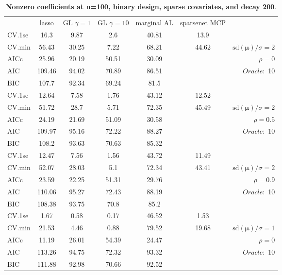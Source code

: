 \begin{table}\vspace{-.5cm}
\caption[l]{ { \bf Nonzero coefficients at n=100, binary design, 
sparse covariates, and  decay  200}.}
\vspace{-.5cm}
\footnotesize{}
\begin{center}
\begin{tabular}{l*{5}{c}|r}
& lasso & GL $\gamma=1$ & GL $\gamma=10$ & marginal AL & sparsenet MCP  & \\
 \cline{1-7}
CV.1se & 16.3 & 9.87 & 2.6 & 40.81 & 13.9 & \\
CV.min & 56.43 & 30.25 & 7.22 & 68.21 & 44.62 &  $\mathrm{sd}(\mathbf{\mu})/\sigma=2$ \\
AICc & 25.96 & 20.19 & 50.51 & 30.09 & & $\rho=0$ \\
AIC & 109.46 & 94.02 & 70.89 & 86.51 & &  \multirow{2}{*}{$Oracle: $ 10} \\
BIC & 107.7 & 92.34 & 69.24 & 81.5 & &  \\
 \hline 
CV.1se & 12.64 & 7.58 & 1.76 & 43.12 & 12.52 & \\
CV.min & 51.72 & 28.7 & 5.71 & 72.35 & 45.49 &  $\mathrm{sd}(\mathbf{\mu})/\sigma=2$ \\
AICc & 24.19 & 21.69 & 51.09 & 30.58 & & $\rho=0.5$ \\
AIC & 109.97 & 95.16 & 72.22 & 88.27 & &  \multirow{2}{*}{$Oracle: $ 10} \\
BIC & 108.2 & 93.63 & 70.63 & 85.32 & &  \\
 \hline 
CV.1se & 12.47 & 7.56 & 1.56 & 43.72 & 11.49 & \\
CV.min & 52.07 & 28.03 & 5.1 & 72.34 & 43.41 &  $\mathrm{sd}(\mathbf{\mu})/\sigma=2$ \\
AICc & 23.59 & 22.25 & 51.31 & 29.76 & & $\rho=0.9$ \\
AIC & 110.06 & 95.27 & 72.43 & 88.19 & &  \multirow{2}{*}{$Oracle: $ 10} \\
BIC & 108.38 & 93.75 & 70.8 & 85.2 & &  \\
 \hline 
CV.1se & 1.67 & 0.58 & 0.17 & 46.52 & 1.53 & \\
CV.min & 21.53 & 4.46 & 0.88 & 79.52 & 19.68 &  $\mathrm{sd}(\mathbf{\mu})/\sigma=1$ \\
AICc & 11.19 & 26.01 & 54.39 & 24.47 & & $\rho=0$ \\
AIC & 113.26 & 94.75 & 72.32 & 93.32 & &  \multirow{2}{*}{$Oracle: $ 10} \\
BIC & 111.88 & 92.98 & 70.66 & 92.52 & &  \\

\end{tabular}
\end{center}
\end{table}
